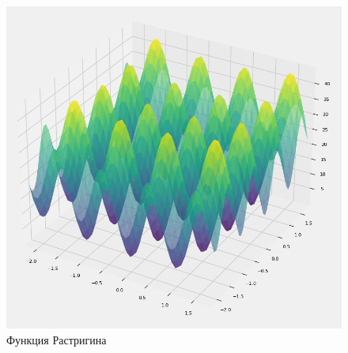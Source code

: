 \documentclass[12pt, a4paper, russian]{article}
\begin{document}
\begin{figure}[ht!]
	\begin{center}
			\begin{minipage}[h]{0.8\linewidth}
					\includegraphics[width=1\linewidth]{figure/Figure_1}
					\caption{Функция Растригина} %
					\label{fig:fig2}
				\end{minipage}
		\end{center}
\end{figure}	
\end{document}
